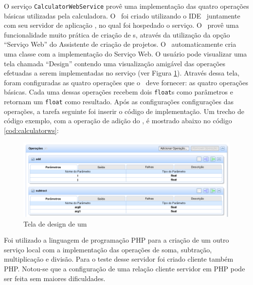 
O serviço \texttt{CalculatorWebService} provê uma implementação das quatro
operações básicas utilizadas pela calculadora. O \WebService\ foi criado utilizando o IDE
\NetBeans\ juntamente com seu servidor de aplicação \Glassfish, no qual foi hospedado o
serviço. O \NetBeans\ provê uma funcionalidade muito prática de criação de
\WebService s, através da utilização da opção ``Serviço Web'' do Assistente de criação de
projetos. O \NetBeans\ automaticamente cria uma classe com a implementação do
Serviço Web. O usuário pode visualizar uma tela chamada 
``Design'' contendo uma visualização amigável das operações efetuadas a serem
implementadas no serviço (ver Figura \ref{fig:arquitetura:design}). Através
dessa tela, foram configuradas as quatro operações que o \WebService\ deve
fornecer: as quatro operações básicas. Cada uma dessas operações recebem dois
\texttt{float}s como parâmetros e retornam um \texttt{float} como resultado.
Após as configurações configurações das operações, a tarefa seguinte foi inserir
o código de implementação. Um trecho de código exemplo, com a operação de adição
do \WebService, é mostrado abaixo no código \ref{cod:calculatorws}:



\begin{figure}[htb]
  \centering
  \includegraphics[width=\textwidth]{imgs/webservice-design}
  \caption{Tela de design de um \WebService}
  \label{fig:arquitetura:design}
\end{figure}

Foi utilizado a linguagem de programação PHP para a criação de um outro serviço
local com a implementação das operações de soma, subtração, multiplicação e
divisão. Para o teste desse servidor foi criado cliente também PHP. Notou-se que
a configuração de uma relação cliente servidor em PHP pode ser feita sem maiores
dificuldades.

